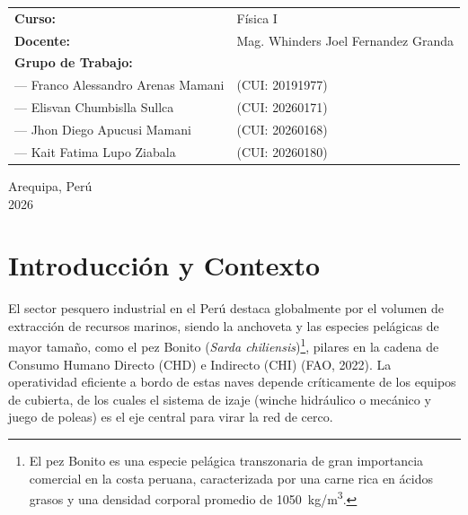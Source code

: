 \documentclass[11pt,a4paper]{article}
\begin{document}
\begin{titlepage}
    \vspace{1.5cm}
    
    \begin{minipage}{0.85\textwidth}
        \fontsize{10pt}{12pt}\selectfont\sffamily
        \begin{tabular}{ll}
            \textbf{Curso:} & Física I \\
            \textbf{Docente:} & Mag. Whinders Joel Fernandez Granda \\
            \textbf{Grupo de Trabajo:} & \\
            --- Franco Alessandro Arenas Mamani & (CUI: 20191977) \\
            --- Elisvan Chumbislla Sullca & (CUI: 20260171) \\
            --- Jhon Diego Apucusi Mamani & (CUI: 20260168) \\
            --- Kait Fatima Lupo Ziabala & (CUI: 20260180) \\
        \end{tabular}
    \end{minipage}
    
    \vfill
    
    {\fontsize{10pt}{12pt}\selectfont\sffamily\color{oceanSecondary} Arequipa, Perú \\ 2026}
\end{titlepage}


\newpage
\thispagestyle{plain}
\tableofcontents
\newpage


\section{Introducción y Contexto}
El sector pesquero industrial en el Perú destaca globalmente por el volumen de extracción de recursos marinos, siendo la anchoveta y las especies pelágicas de mayor tamaño, como el pez Bonito (\textit{Sarda chiliensis})\footnote{El pez Bonito es una especie pelágica transzonaria de gran importancia comercial en la costa peruana, caracterizada por una carne rica en ácidos grasos y una densidad corporal promedio de \SI{1050}{kg/m^3}.}, pilares en la cadena de Consumo Humano Directo (CHD) e Indirecto (CHI) (FAO, 2022). La operatividad eficiente a bordo de estas naves depende críticamente de los equipos de cubierta, de los cuales el sistema de izaje (winche hidráulico o mecánico y juego de poleas) es el eje central para virar la red de cerco.
\end{document}
